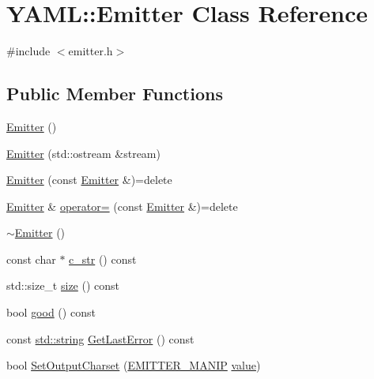 \hypertarget{class_y_a_m_l_1_1_emitter}{}\section{Y\+A\+ML\+::Emitter Class Reference}
\label{class_y_a_m_l_1_1_emitter}


{\ttfamily \#include $<$emitter.\+h$>$}

\subsection*{Public Member Functions}
\begin{DoxyCompactItemize}
\item 
\mbox{\hyperlink{class_y_a_m_l_1_1_emitter_a10fd811fe8450356c5e765352820169f}{Emitter}} ()
\item 
\mbox{\hyperlink{class_y_a_m_l_1_1_emitter_afddbf9941ea486f61196ba186521da01}{Emitter}} (std\+::ostream \&stream)
\item 
\mbox{\hyperlink{class_y_a_m_l_1_1_emitter_ade8be1f6aeecf9869e0e0e3130c51ee2}{Emitter}} (const \mbox{\hyperlink{class_y_a_m_l_1_1_emitter}{Emitter}} \&)=delete
\item 
\mbox{\hyperlink{class_y_a_m_l_1_1_emitter}{Emitter}} \& \mbox{\hyperlink{class_y_a_m_l_1_1_emitter_a5b8be0da0f32b51c7ba46ca7ade7657e}{operator=}} (const \mbox{\hyperlink{class_y_a_m_l_1_1_emitter}{Emitter}} \&)=delete
\item 
\mbox{\hyperlink{class_y_a_m_l_1_1_emitter_a14eebff3d7a6a4a8706b75b36261ee03}{$\sim$\+Emitter}} ()
\item 
const char $\ast$ \mbox{\hyperlink{class_y_a_m_l_1_1_emitter_a0b965b7db9006956e8448aaac8db2b13}{c\+\_\+str}} () const
\item 
std\+::size\+\_\+t \mbox{\hyperlink{class_y_a_m_l_1_1_emitter_a53d12ff62ad4cd6e5b898f8014f85fd6}{size}} () const
\item 
bool \mbox{\hyperlink{class_y_a_m_l_1_1_emitter_a3a0c449843c5fda5d1e6faae188debcb}{good}} () const
\item 
const \mbox{\hyperlink{glad_8h_ac83513893df92266f79a515488701770}{std\+::string}} \mbox{\hyperlink{class_y_a_m_l_1_1_emitter_a79ccd566493396d0312bfc8ca45397ca}{Get\+Last\+Error}} () const
\item 
bool \mbox{\hyperlink{class_y_a_m_l_1_1_emitter_a10dfc121c33f7b1f75e2d8018ad83c60}{Set\+Output\+Charset}} (\mbox{\hyperlink{namespace_y_a_m_l_a67c320aa50d3de7ecba1d0b8775dd684}{E\+M\+I\+T\+T\+E\+R\+\_\+\+M\+A\+N\+IP}} \mbox{\hyperlink{glad_8h_a03aff08f73d7fde3d1a08e0abd8e84fa}{value}})

\end{DoxyCompactItemize}
